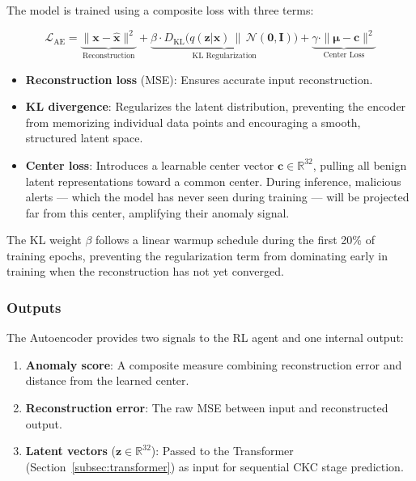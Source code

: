 The model is trained using a composite loss with three terms:

\begin{equation}
    \mathcal{L}_{\text{AE}} = \underbrace{\| \mathbf{x} - \hat{\mathbf{x}} \|^2}_{\text{Reconstruction}} + \underbrace{\beta \cdot D_{\text{KL}}\big(q(\mathbf{z}|\mathbf{x}) \,\|\, \mathcal{N}(\mathbf{0}, \mathbf{I})\big)}_{\text{KL Regularization}} + \underbrace{\gamma \cdot \| \boldsymbol{\mu} - \mathbf{c} \|^2}_{\text{Center Loss}}
    \label{eq:ae_loss}
\end{equation}

\begin{itemize}
    \item \textbf{Reconstruction loss} (MSE): Ensures accurate input reconstruction.
    \item \textbf{KL divergence}: Regularizes the latent distribution, preventing the encoder from memorizing individual data points and encouraging a smooth, structured latent space.
    \item \textbf{Center loss}: Introduces a learnable center vector $\mathbf{c} \in \mathbb{R}^{32}$, pulling all benign latent representations toward a common center. During inference, malicious alerts --- which the model has never seen during training --- will be projected far from this center, amplifying their anomaly signal.
\end{itemize}

The KL weight $\beta$ follows a linear warmup schedule during the first 20\% of training epochs, preventing the regularization term from dominating early in training when the reconstruction has not yet converged.

\subsubsection{Outputs}

The Autoencoder provides two signals to the RL agent and one internal output:
\begin{enumerate}
    \item \textbf{Anomaly score}: A composite measure combining reconstruction error and distance from the learned center.
    \item \textbf{Reconstruction error}: The raw MSE between input and reconstructed output.
    \item \textbf{Latent vectors} ($\mathbf{z} \in \mathbb{R}^{32}$): Passed to the Transformer (Section~\ref{subsec:transformer}) as input for sequential CKC stage prediction.
\end{enumerate}


